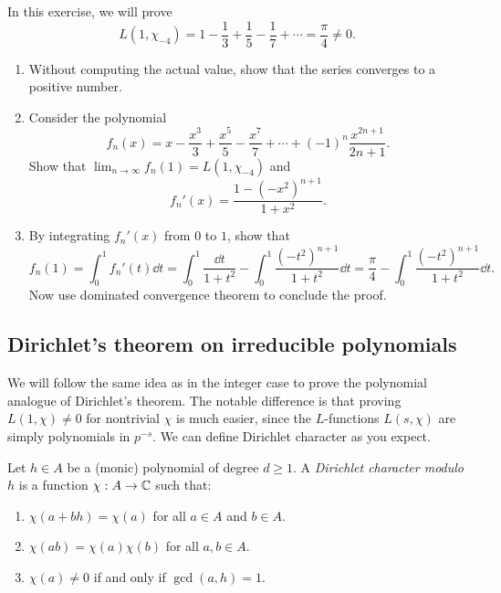 \begin{exercise}
    In this exercise, we will prove 
    \begin{equation}
        L(1, \chi_{-4}) = 1 - \frac{1}{3} + \frac{1}{5} - \frac{1}{7} + \cdots = \frac{\pi}{4} \ne 0.
    \end{equation}
    \begin{enumerate}
        \item Without computing the actual value, show that the series converges to a positive number.
        \item Consider the polynomial
        \[
        f_n(x) = x - \frac{x^3}{3} + \frac{x^5}{5} - \frac{x^7}{7} + \cdots + (-1)^n \frac{x^{2n + 1}}{2n + 1}.
        \]
        Show that $\lim_{n \to \infty} f_n(1) = L(1, \chi_{-4})$ and
        \[
        f_n'(x) = \frac{1 - (-x^2)^{n+1}}{1 + x^2}.
        \]
        \item By integrating $f_n'(x)$ from $0$ to $1$, show that
        \[
        f_n(1) = \int_0^1 f_n'(t) \dd t = \int_0^1 \frac{\dd t}{1 + t^2} - \int_0^1 \frac{(-t^2)^{n+1}}{1 + t^2} \dd t = \frac{\pi}{4} - \int_0^1 \frac{(-t^2)^{n+1}}{1 + t^2} \dd t.
        \]
        Now use dominated convergence theorem to conclude the proof.
    \end{enumerate}
\end{exercise}

\subsection{Dirichlet's theorem on irreducible polynomials}
\label{sec:dirichlet-polynomials}

We will follow the same idea as in the integer case to prove the polynomial analogue of Dirichlet's theorem.
The notable difference is that proving $L(1, \chi) \ne 0$ for nontrivial $\chi$ is much easier, since the $L$-functions $L(s, \chi)$ are simply polynomials in $p^{-s}$.
We can define Dirichlet character as you expect.
\begin{definition}
    \label{def:dirichlet-character-poly}
    Let $h \in A$ be a (monic) polynomial of degree $d \geq 1$.
    A \emph{Dirichlet character modulo $h$} is a function $\chi: A \to \mathbb{C}$ such that:
    \begin{enumerate}
        \item $\chi(a + bh) = \chi(a)$ for all $a \in A$ and $b \in A$.
        \item $\chi(ab) = \chi(a)\chi(b)$ for all $a, b \in A$.
        \item $\chi(a) \ne 0$ if and only if $\gcd(a, h) = 1$.
    \end{enumerate}
\end{definition}

